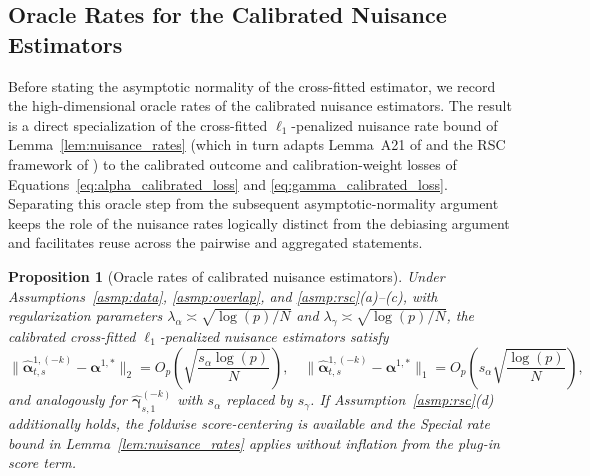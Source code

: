 \documentclass{article}
\newtheorem{proposition}[theorem]{Proposition}
\begin{document}
\subsection{Oracle Rates for the Calibrated Nuisance Estimators}\label{sec:oracle}

Before stating the asymptotic normality of the cross-fitted estimator, we record the high-dimensional oracle rates of the calibrated nuisance estimators. The result is a direct specialization of the cross-fitted $\ell_1$-penalized nuisance rate bound of Lemma~\ref{lem:nuisance_rates} (which in turn adapts Lemma~A21 of \citet{hou2025efficient} and the RSC framework of \citet{negahban2012unified,tan2020model,buhlmann2011statistics}) to the calibrated outcome and calibration-weight losses of Equations~\eqref{eq:alpha_calibrated_loss} and \eqref{eq:gamma_calibrated_loss}. Separating this oracle step from the subsequent asymptotic-normality argument keeps the role of the nuisance rates logically distinct from the debiasing argument and facilitates reuse across the pairwise and aggregated statements.

\begin{proposition}[Oracle rates of calibrated nuisance estimators]\label{prop:oracle_rates}
Under Assumptions~\ref{asmp:data}, \ref{asmp:overlap}, and \ref{asmp:rsc}(a)--(c), with regularization parameters $\lambda_\alpha\asymp\sqrt{\log(p)/N}$ and $\lambda_\gamma\asymp\sqrt{\log(p)/N}$, the calibrated cross-fitted $\ell_1$-penalized nuisance estimators satisfy
\[
\|\widehat{\boldsymbol{\alpha}}_{t,s}^{1,(-k)}-\boldsymbol{\alpha}^{1,*}\|_2 = O_p\!\left(\sqrt{\frac{s_\alpha\log(p)}{N}}\right),
\quad
\|\widehat{\boldsymbol{\alpha}}_{t,s}^{1,(-k)}-\boldsymbol{\alpha}^{1,*}\|_1 = O_p\!\left(s_\alpha\sqrt{\frac{\log(p)}{N}}\right),
\]
and analogously for $\widehat{\boldsymbol{\gamma}}_{s,1}^{(-k)}$ with $s_\alpha$ replaced by $s_\gamma$. If Assumption~\ref{asmp:rsc}(d) additionally holds, the foldwise score-centering is available and the \emph{Special} rate bound in Lemma~\ref{lem:nuisance_rates} applies without inflation from the plug-in score term.
\end{proposition}
\end{document}
